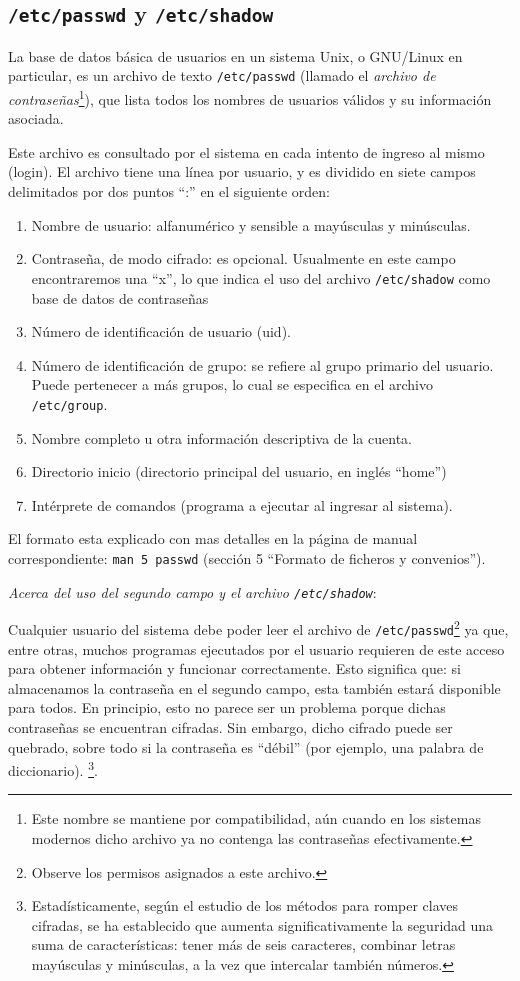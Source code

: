 \documentclass[12pt]{article}
\begin{document}
\subsection{ \texttt{/etc/passwd} y \texttt{/etc/shadow}}

La base de datos básica de usuarios en un sistema Unix, o GNU/Linux en particular, 
es un archivo de texto  \texttt{/etc/passwd} (llamado el \textit{archivo de
contraseñas}\footnote{Este nombre se mantiene por compatibilidad, aún cuando 
en los sistemas modernos dicho archivo ya no contenga las contraseñas efectivamente.}), 
que lista todos los nombres de usuarios válidos y su información asociada. 

Este archivo es consultado por el sistema en cada intento de ingreso al mismo (login).
El archivo tiene una línea por usuario, y es dividido en siete campos delimitados por 
dos puntos ``:'' en el siguiente orden:


	\begin{enumerate}
	\item{Nombre de usuario: alfanumérico y sensible a mayúsculas y minúsculas.}
	\item{Contraseña, de modo cifrado: es opcional. Usualmente en este campo encontraremos 
	una ``x'', lo que indica el uso del archivo \texttt{/etc/shadow} como base de datos de 
	contraseñas}
	\item{Número de identificación de usuario (uid).} 
	\item{Número de identificación de grupo: se refiere al grupo primario del usuario. Puede 
	pertenecer a más grupos, lo cual se especifica en el archivo \texttt{/etc/group}}.
	\item{Nombre completo u otra información descriptiva de la cuenta.}
	\item{Directorio inicio (directorio principal del usuario, en inglés ``home'')}
	\item{Intérprete de comandos (programa a ejecutar al ingresar al sistema).}
	\end{enumerate}

El formato esta explicado con mas detalles en la página de manual correspondiente: 
\texttt{man 5 passwd} (sección 5 ``Formato de ficheros y convenios'').

\textit{Acerca del uso del segundo campo y el archivo \texttt{/etc/shadow}}: 

Cualquier usuario del sistema debe poder leer el archivo de \texttt{/etc/passwd}\footnote{
Observe los permisos asignados a este archivo.} ya que, 
entre otras, muchos programas ejecutados por el usuario requieren de este acceso 
para obtener información y funcionar correctamente. Esto significa que: si almacenamos 
la contraseña en el segundo campo, esta también estará disponible para todos. En principio, 
esto no parece ser un problema porque dichas contraseñas se encuentran cifradas.  
Sin embargo, dicho cifrado puede ser quebrado, sobre todo si la contraseña es ``débil'' (por ejemplo, 
una palabra de diccionario).  \footnote{Estadísticamente, según el estudio de
los métodos para romper claves cifradas, se ha establecido que aumenta
significativamente la seguridad una suma de características: tener más de seis
caracteres, combinar letras mayúsculas y minúsculas, a la vez que intercalar
también números.}. 
\end{document}
